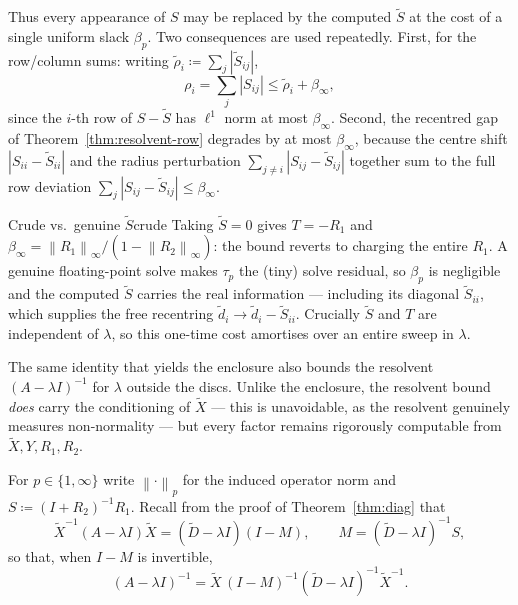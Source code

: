 \documentclass[11pt, a4paper]{article}
\numberwithin{equation}{section}
\newcommand{\norm}[1]{\left\|#1\right\|}
\newcommand{\abs}[1]{\left|#1\right|}
\newcommand{\tX}{\widetilde{X}}
\newcommand{\tD}{\widetilde{D}}
\begin{document}
Thus every appearance of $S$ may be replaced by the computed $\tilde S$ at the
cost of a single uniform slack $\beta_p$.  Two consequences are used repeatedly.
First, for the row/column sums: writing $\tilde\rho_i \coloneqq \sum_j
\abs{\tilde S_{ij}}$,
\begin{equation}\label{eq:rho-tilde}
  \rho_i = \sum_j \abs{S_{ij}} \le \tilde\rho_i + \beta_\infty,
\end{equation}
since the $i$-th row of $S - \tilde S$ has $\ell^1$ norm at most $\beta_\infty$.
Second, the recentred gap of Theorem~\ref{thm:resolvent-row} degrades by at most
$\beta_\infty$, because the centre shift $\abs{S_{ii} - \tilde S_{ii}}$ and the
radius perturbation $\sum_{j\ne i}\abs{S_{ij} - \tilde S_{ij}}$ together sum to
the full row deviation $\sum_j \abs{S_{ij} - \tilde S_{ij}} \le \beta_\infty$.

\begin{remark}{Crude vs.\ genuine $\tilde S$}{crude}
  Taking $\tilde S = 0$ gives $T = -R_1$ and $\beta_\infty = \norm{R_1}_\infty /
  (1 - \norm{R_2}_\infty)$: the bound reverts to charging the entire $R_1$.  A
  genuine floating-point solve makes $\tau_p$ the (tiny) solve residual, so
  $\beta_p$ is negligible and the computed $\tilde S$ carries the real
  information --- including its diagonal $\tilde S_{ii}$, which supplies the free
  recentring $\tilde d_i \to \tilde d_i - \tilde S_{ii}$.  Crucially $\tilde S$
  and $T$ are independent of $\lambda$, so this one-time cost amortises over an
  entire sweep in $\lambda$.
\end{remark}



The same identity that yields the enclosure also bounds the resolvent
$(A - \lambda I)^{-1}$ for $\lambda$ outside the discs.  Unlike the enclosure,
the resolvent bound \emph{does} carry the conditioning of $\tX$ --- this is
unavoidable, as the resolvent genuinely measures non-normality --- but every
factor remains rigorously computable from $\tX, Y, R_1, R_2$.

For $p \in \{1, \infty\}$ write $\norm{\cdot}_p$ for the induced operator norm
and $S \coloneqq (I + R_2)^{-1} R_1$.  Recall from the proof of
Theorem~\ref{thm:diag} that
\[
  \tX^{-1}(A - \lambda I)\tX = (\tD - \lambda I)(I - M),
  \qquad M = (\tD - \lambda I)^{-1} S,
\]
so that, when $I - M$ is invertible,
\begin{equation}\label{eq:resolvent-factored}
  (A - \lambda I)^{-1} = \tX\,(I - M)^{-1}(\tD - \lambda I)^{-1}\tX^{-1}.
\end{equation}
\end{document}
